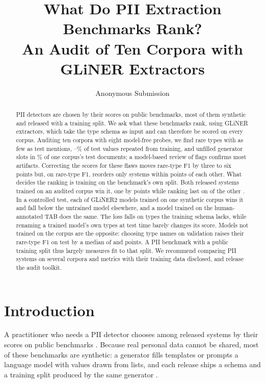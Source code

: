 \documentclass[11pt]{article}
\title{What Do PII Extraction Benchmarks Rank?\\
An Audit of Ten Corpora with GLiNER Extractors}
\author{Anonymous Submission}
\begin{document}
\maketitle

\begin{abstract}
PII detectors are chosen by their scores on public benchmarks, most of
them synthetic and released with a training split. We ask what these
benchmarks rank, using GLiNER extractors, which take the type schema as
input and can therefore be scored on every corpus. Auditing ten corpora
with eight model-free probes, we
find rare types with as few as  test mentions,
--\% of test values repeated
from training, and unfilled generator slots in
\% of one corpus's test documents; a
model-based review of  flags confirms most artifacts.
Correcting the scores for these flaws moves rare-type F1 by three to six
points but, on rare-type F1, reorders only systems within
 points of each other. What decides the ranking is training on the benchmark's own
split. Both released systems trained on an audited corpus win it, one by
 points while ranking last on 
of the other . In a controlled test, each of
 GLiNER2 models trained on one synthetic corpus wins it and
 fall below the untrained model elsewhere, and a model
trained on the human-annotated TAB does the same. The loss falls on
types the training schema lacks, while renaming a trained model's own
types at test time barely changes its score. Models not trained on the
corpus are the opposite: choosing type names on validation raises their
rare-type F1 on test by a median of  and 
points. A PII benchmark with a
public training split thus largely measures fit to that split. We
recommend comparing PII systems on several corpora and metrics with
their training data disclosed, and release the audit toolkit.
\end{abstract}

\section{Introduction}
\label{sec:introduction}

A practitioner who needs a PII detector chooses among released systems
by their scores on public benchmarks \cite{zaratiana2026gliner2pii,
uppala2026opf}. Because real personal data cannot be shared, most of
these benchmarks are synthetic: a generator fills templates or prompts
a language model with values drawn from lists, and each release ships a
schema and a training split produced by the same generator
\cite{ai4privacy_open_pii_masking_500k,nemotron-pii,savkin-etal-2025-spy}.
\end{document}
